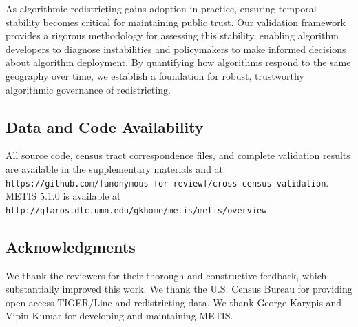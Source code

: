 As algorithmic redistricting gains adoption in practice, ensuring temporal stability becomes critical for maintaining public trust. Our validation framework provides a rigorous methodology for assessing this stability, enabling algorithm developers to diagnose instabilities and policymakers to make informed decisions about algorithm deployment. By quantifying how algorithms respond to the same geography over time, we establish a foundation for robust, trustworthy algorithmic governance of redistricting.

\subsection*{Data and Code Availability}

All source code, census tract correspondence files, and complete validation results are available in the supplementary materials and at \texttt{https://github.com/[anonymous-for-review]/cross-census-validation}. METIS 5.1.0 is available at \texttt{http://glaros.dtc.umn.edu/gkhome/metis/metis/overview}.

\subsection*{Acknowledgments}

We thank the reviewers for their thorough and constructive feedback, which substantially improved this work. We thank the U.S. Census Bureau for providing open-access TIGER/Line and redistricting data. We thank George Karypis and Vipin Kumar for developing and maintaining METIS.
